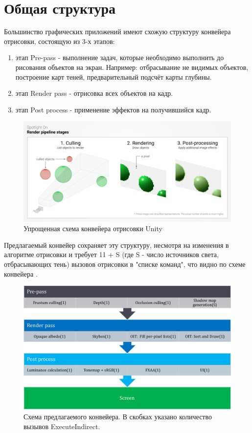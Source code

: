 \section{Общая структура} \label{ch3:pipeline_struct}
	Большинство графических приложений имеют схожую структуру конвейера отрисовки, состоящую из 3-х этапов:
	\begin{enumerate}[1.] 
		\item этап Pre-pass - выполнение задач, которые необходимо выполнить до рисования объектов на экран. Например: отбрасывание не видимых объектов, построение карт теней, предварительный подсчёт карты глубины.
		\item этап Render pass - отрисовка всех объектов на кадр.
		\item этап Post process - применение эффектов на получившийся кадр.
	\end{enumerate}
		
	\begin{figure}[ht!] 
		\center
		\includegraphics [scale=0.35] {my_folder/images//unity_pipeline}	
		\caption{Упрощенная схема конвейера отрисовки Unity} 
		\label{fig:unity_pipeline}  
	\end{figure}

	Предлагаемый конвейер сохраняет эту структуру, несмотря на изменения в алгоритме отрисовки и требует 11 + S (где S - число источников света, отбрасывающих тень) вызовов отрисовки в "списке команд", что видно по схеме конвейера .
	
	\begin{figure}[ht!] 
		\center
		\includegraphics [scale=0.4] {my_folder/images//pipeline_schema}	
		\caption{Схема предлагаемого конвейера. В скобках указано количество вызывов ExecuteIndirect.} 
		\label{fig:pipeline_schema}  
	\end{figure}
	
	\FloatBarrier